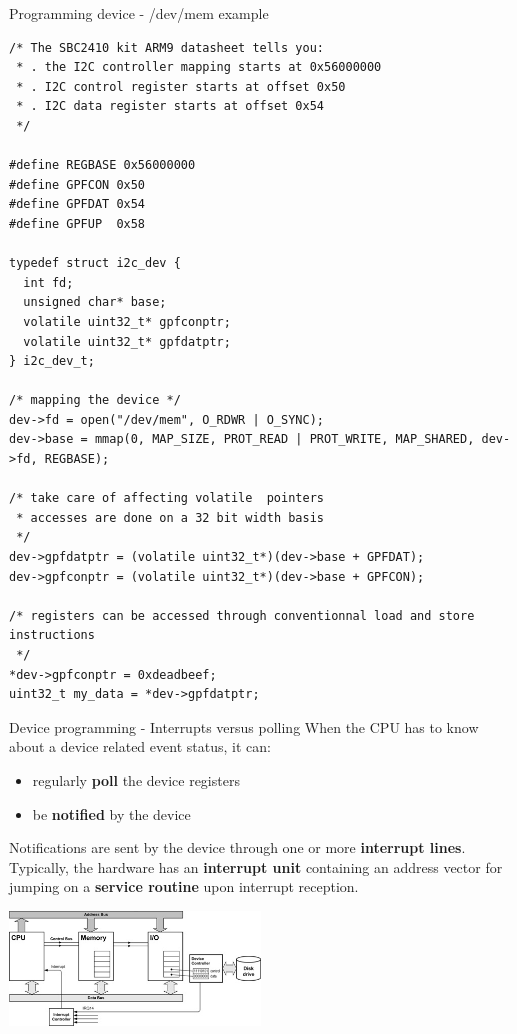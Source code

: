 \begin{frame}[containsverbatim]{Programming device - /dev/mem example}
  \begin{tiny}
    \lstset{language=C}
    \begin{lstlisting}[frame=tb]
/* The SBC2410 kit ARM9 datasheet tells you:
 * . the I2C controller mapping starts at 0x56000000
 * . I2C control register starts at offset 0x50
 * . I2C data register starts at offset 0x54
 */

#define REGBASE 0x56000000
#define GPFCON 0x50
#define GPFDAT 0x54
#define GPFUP  0x58

typedef struct i2c_dev {
  int fd;
  unsigned char* base;
  volatile uint32_t* gpfconptr;
  volatile uint32_t* gpfdatptr;
} i2c_dev_t;

/* mapping the device */
dev->fd = open("/dev/mem", O_RDWR | O_SYNC);
dev->base = mmap(0, MAP_SIZE, PROT_READ | PROT_WRITE, MAP_SHARED, dev->fd, REGBASE);

/* take care of affecting volatile  pointers
 * accesses are done on a 32 bit width basis
 */
dev->gpfdatptr = (volatile uint32_t*)(dev->base + GPFDAT);
dev->gpfconptr = (volatile uint32_t*)(dev->base + GPFCON);

/* registers can be accessed through conventionnal load and store instructions
 */
*dev->gpfconptr = 0xdeadbeef;
uint32_t my_data = *dev->gpfdatptr;
    \end{lstlisting}
  \end{tiny}
\end{frame}

\begin{frame}{Device programming - Interrupts versus polling}
  When the CPU has to know about a device related event status, it can:
  \begin{itemize}
  \item regularly \textbf{poll} the device registers
  \item be \textbf{notified} by the device
  \end{itemize}

  Notifications are sent by the device through one or more \textbf{interrupt lines}.
  Typically, the hardware has an \textbf{interrupt unit} containing an address vector
  for jumping on a \textbf{service routine} upon interrupt reception.

  \smallskip
  \begin{center}
    \includegraphics[width=0.5\textwidth]{figures/misc_irq.jpg}
  \end{center}

\end{frame}

